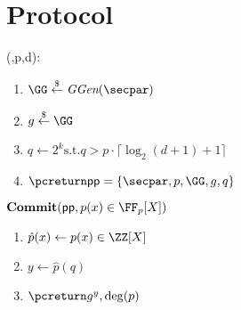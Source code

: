 \documentclass{article}
\begin{document}
\section{Protocol}
\label{sec:protocol}
\begin{mdframed}[userdefinedwidth=0.8\textwidth]
\begin{minipage}{\textwidth}
	\begin{flushleft}
	\setup(\secpar,p,d):
		\begin{enumerate}[nolistsep]
			\item $ \GG \sample \ggen(\secpar)$
			\item $ g \sample \GG$
			\item $q\gets 2^k \text{s.t.} q> p \cdot \lceil \log_2(d+1)+1\rceil $
			\item $\pcreturn \crs=\{\secpar,p,\GG,g,q\}$
		\end{enumerate}
		$\commit(\crs,p(x)\in \FF_p[X])$
		\begin{enumerate}[nolistsep]
			\item 	$\hat{p}(x)\gets p(x) \in \ZZ[X]$
			\item $y\gets \hat{p}(q)$
			\item $\pcreturn g^y,\deg(p)$
		\end{enumerate}
		
	\end{flushleft}
\end{minipage}
\end{mdframed}
\end{document}

